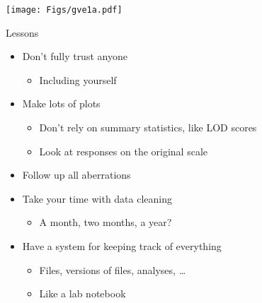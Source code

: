 \documentclass[12pt]{article}
\newcommand{\headsize}{\fontsize{35}{35} \selectfont}
\newcommand{\smallersize}{\fontsize{20}{25} \selectfont}
\newcommand{\smallestsize}{\fontsize{18}{22} \selectfont}
\begin{document}
\vfill

\centerline{\texttt{[image: Figs/gve1a.pdf]}}

\newpage

\headsize \color{myyellow}
\hfill \begin{minipage}{5.75in}
\centering
Lessons
\end{minipage}

\vspace{20mm} \color{mywhite} \smallersize

\hfill \begin{minipage}{10in}

\begin{itemize}
\itemsep24pt

\item Don't fully trust anyone
{\smallestsize \color{myblue}
\begin{itemize}
\item Including yourself
\end{itemize} }

\item Make lots of plots
{\smallestsize \color{myblue}
\begin{itemize}
\item Don't rely on summary statistics, like LOD scores
\item Look at responses on the original scale
\end{itemize} }

\item Follow up all aberrations

\item Take your time with data cleaning
{\smallestsize \color{myblue}
\begin{itemize}
\item A month, two months, a year?
\end{itemize} }

\item Have a system for keeping track of everything
{\smallestsize \color{myblue}
\begin{itemize}
\item Files, versions of files, analyses, \dots
\item Like a lab notebook
\end{itemize} }



\end{itemize}
\end{minipage}

\newpage
\end{document}
